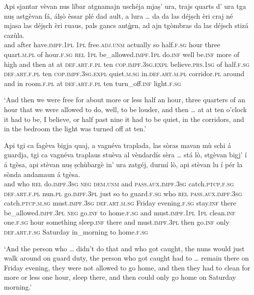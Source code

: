 \begin{linenumbers}
\gll    Api sjantar vèvan nus líbar atgnamajn uschéja mjaṣ’ ura, trajs quarts d’ ura tga nuṣ astgèvan fá, álṣò èssar plé dad ault, a lura … da da las déjṣch èri craj né mjasa las déjṣch èri ruaus, pals gancs ant\underline{ù}rn, ad ajn tgòmbras da las déjsch stizá cazùla.\\
and after have.\textsc{impf.1pl} \textsc{1pl} free.\textsc{adj.unm} actually so half.\textsc{f.sg} hour three quart.\textsc{m.pl} of hour.\textsc{f.sg} \textsc{rel} \textsc{1pl} be\_allowed.\textsc{impf.1pl} do.\textsc{inf} well be.\textsc{inf} more of high and then {} at at \textsc{def.art.f.pl} ten \textsc{cop.impf.3sg.expl} believe.\textsc{prs.1sg} of  half.\textsc{f.sg} \textsc{def.art.f.pl} ten \textsc{cop.impf.3sg.expl} quiet.\textsc{m.sg} in.\textsc{def.art.m.pl} corridor.\textsc{pl} around and in room.\textsc{f.pl} at \textsc{def.art.f.pl} ten turn\_off.\textsc{inf} light.\textsc{f.sg}\\
\end{linenumbers}
\medskip
\glt `And then we were free for about more or less half an hour, three quarters of an hour that we were allowed to do, well, to be louder, and then … at at ten o’clock it had to be, I believe, or half past nine it had to be quiet, in the corridors, and in the bedroom the light was turned off at ten.'
\medskip

\begin{linenumbers}
\gll    Api tgi ca fagèva bigja quaj, a vagnéva traplada, las sòras mavan mù schi á guardja, tgi ca vagnéva traplaus stuèva al vèndardís sèra … stá lò, stgèvan bigj’ í á tgèsa, api stèvan nuṣ ṣchùbargè in’ ura zatgéj, durmí lò, api stèvan lu í pér la sònda andamaun á tgèsa.\\
and who \textsc{rel} do.\textsc{impf.3sg} \textsc{neg} \textsc{dem.unm} and \textsc{pass.aux.impf.3sg} catch.\textsc{ptcp.f.sg} \textsc{def.art.f.pl} nun.\textsc{pl} go.\textsc{impf.3pl} just so to guard.\textsc{f.sg}  who \textsc{rel} \textsc{pass.aux.impf.3sg} catch.\textsc{ptcp.m.sg} must.\textsc{impf.3sg} \textsc{def.art.m.sg} Friday evening.\textsc{f.sg} {} stay.\textsc{inf} there be\_allowed.\textsc{impf.3pl} \textsc{neg} go.\textsc{inf} to home.\textsc{f.sg} and must.\textsc{impf.1pl} \textsc{1pl} clean.\textsc{inf} one.\textsc{f.sg} hour something sleep.\textsc{inf} there and must.\textsc{impf.3pl} then go.\textsc{inf} only \textsc{def.art.f.sg} Saturday in\_morning to home.\textsc{f.sg}\\
\end{linenumbers}
\medskip
\glt `And the person who … didn’t do that and who got caught, the nuns would just walk around on guard duty, the person who got caught had to … remain there on Friday evening, they were not allowed to go home, and then they had to clean for more or less one hour, sleep there, and then could only go home on Saturday morning.'
\medskip


